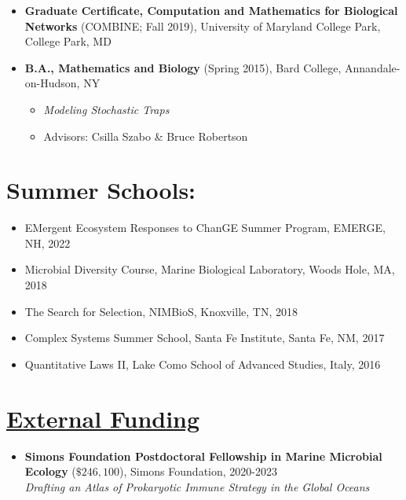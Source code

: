\documentclass[]{res}
\begin{document}
\begin{resume}
\begin{itemize}[leftmargin=*]
\begin{itemize}[leftmargin=*]
\item[] {\bf Graduate Certificate, Computation and Mathematics for Biological Networks} (COMBINE; Fall 2019),
University of Maryland College Park, College Park, MD

\item[]  {\bf B.A., Mathematics and Biology}  (Spring 2015), Bard College, Annandale-on-Hudson, NY
\begin{itemize}
\item[] \emph{Modeling Stochastic Traps}%
\item[] Advisors: Csilla Szabo \& Bruce Robertson
\end{itemize}
\end{itemize}

 
\section{{Summer Schools:}}%
\begin{itemize}[leftmargin=*]
\item[] {EMergent Ecosystem Responses to ChanGE Summer Program}, EMERGE, NH, 2022
\item[] {Microbial Diversity Course}, Marine Biological Laboratory, Woods Hole, MA, 2018
\item[] {The Search for Selection}, NIMBioS, Knoxville, TN, 2018
\item[] {Complex Systems Summer School}, Santa Fe Institute, Santa Fe, NM, 2017
\item[] {Quantitative Laws II}, Lake Como School of Advanced Studies, Italy, 2016  
 \end{itemize}
 
 \end{itemize}
 
\section{\underline{External Funding}} %
\begin{itemize}[leftmargin=*]
\item[] {\bf Simons Foundation Postdoctoral Fellowship in Marine Microbial Ecology} ($\$246,100$), Simons Foundation, 2020-2023\\\emph{Drafting an Atlas of Prokaryotic Immune Strategy in the Global Oceans}


\end{itemize}
\end{resume}
\end{document}
